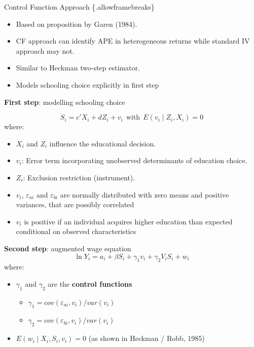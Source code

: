 \documentclass[10pt,ignorenonframetext,]{beamer}
\providecommand{\tightlist}{%
  \setlength{\itemsep}{0pt}\setlength{\parskip}{0pt}}
\begin{document}
\begin{frame}{Control Function Approach \{.allowframebreaks\}}
\protect\hypertarget{control-function-approach-.allowframebreaks}{}

\begin{itemize}
\tightlist
\item
  Based on proposition by Garen (1984).
\item
  CF approach can identify APE in heterogeneous returns while standard
  IV approach may not.
\item
  Similar to Heckman two-step estimator.
\item
  Models schooling choice explicitly in first step
\end{itemize}

\textbf{First step}: modelling schooling choice

\[S_i = c'X_i + dZ_i + v_i ~~\text{with}~~ E(v_i \mid Z_i, X_i) = 0\]
where:

\begin{itemize}
\item
  \(X_i\) and \(Z_i\) influence the educational decision.
\item
  \(v_i\): Error term incorporating unobserved determinants of education
  choice.
\item
  \(Z_i\): Exclusion restriction (instrument).
\item
  \(v_i\), \(\varepsilon_{ai}\) and \(\varepsilon_{bi}\) are normally
  distributed with zero means and positive variances, that are possibly
  correlated
\item
  \(v_i\) is positive if an individual acquires higher education than
  expected conditional on observed characteristics
\end{itemize}

\textbf{Second step}: augmented wage equation
\[\ln Y_i = a_i + \beta S_i + \gamma_1 v_i + \gamma_2 V_iS_i + w_i
\] where:

\begin{itemize}
\item
  \(\gamma_1\) and \(\gamma_2\) are the \textbf{control functions}

  \begin{itemize}
  \item
    \(\gamma_1 = cov(\varepsilon_{ai}, v_i) /var(v_i)\)
  \item
    \(\gamma_2 = cov(\varepsilon_{bi}, v_i) /var(v_i)\)
  \end{itemize}
\item
  \(E(w_i \mid X_i, S_i, v_i) = 0\) (as shown in Heckman / Robb, 1985)
\end{itemize}

\end{frame}
\end{document}
